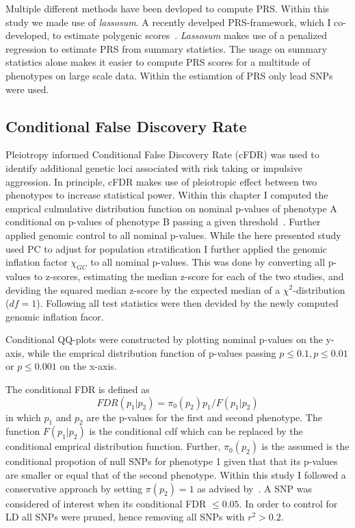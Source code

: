 Multiple different methods have been devloped to compute PRS\@.
Within this study we made use of \textit{lassosum}.
A recently develped PRS-framework, which I co-developed, to estimate polygenic scores~\cite{Mak2016}.
\textit{Lassosum} makes use of a penalized regression to estimate PRS from summary statistics.
The usage on summary statistics alone makes it easier to compute PRS scores for a multitude of phenotypes on large scale data.
Within the estiamtion of PRS only lead SNPs were used.

\subsection{Conditional False Discovery Rate}
\label{sub:conditional_false_discovery_rate}

Pleiotropy informed Conditional False Discovery Rate (cFDR) was used to identify additional genetic loci associated with risk taking or impulsive aggression. 
In principle, cFDR makes use of pleiotropic effect between two phenotypes to increase statistical power.
Within this chapter I computed the emprical culmulative distribution function on nominal p-values of phenotype A conditional on p-values of phenotype B passing a given threshold~\cite{Andreassen2013}.
Further applied genomic control to all nominal p-values.
While the here presented study used PC to adjust for population stratification I further applied the genomic inflation factor $\chi_{GC}$ to all nominal p-values.
This was done by converting all p-values to z-scores, estimating the median z-score for each of the two studies, and deviding the squared median z-score by the expected median of a $\chi^2$-distribution ($df=1$).
Following all test statistics were then devided by the newly computed genomic inflation facor. 

Conditional QQ-plots were constructed by plotting nominal p-values on the y-axis, while the emprical distribution function of p-values passing $p\leq0.1, p\leq 0.01$ or $ p\leq 0.001$ on the x-axis.

The conditional FDR is defined as~\cite{Andreassen2013}
\begin{equation}
  FDR(p_1|p_2)=\pi_0(p_2)p_1/F(p_1|p_2)
\end{equation}
in which $p_1$ and $p_2$ are the p-values for the first and second phenotype.
The function $F(p_1|p_2)$ is the conditional cdf which can be replaced by the conditional emprical distribution function.
Further, $\pi_0(p_2)$ is the assumed is the conditional propotion of null SNPs for phenotype 1 given that that its p-values are smaller or equal that of the second phenotype.
Within this study I followed a conservative approach by setting $\pi(p_2)=1$ as advised by~\citet{Andreassen2013}.
A SNP was considered of interest when its conditional FDR $\leq 0.05$.
In order to control for LD all SNPs were pruned, hence removing all SNPs with $r^2 > 0.2$.

